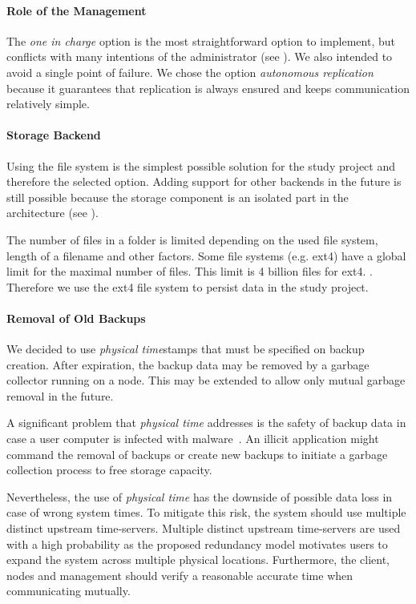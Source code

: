 \paragraph{Role of the Management}
The \emph{one in charge} option is the most straightforward option to implement, but conflicts with many intentions of the administrator (see ). We also intended to avoid a single point of failure. We chose the option \emph{autonomous replication} because it guarantees that replication is always ensured and keeps communication relatively simple.

\paragraph{Storage Backend}
Using the file system is the simplest possible solution for the study project and therefore the selected option. Adding support for other backends in the future is still possible because the storage component is an isolated part in the architecture (see ).

The number of files in a folder is limited depending on the used file system, length of a filename and other factors. Some file systems (e.g. ext4) have a global limit for the maximal number of files. This limit is 4 billion files for ext4. \cite{ext4}. Therefore we use the ext4 file system to persist data in the study project.

\paragraph{Removal of Old Backups}\label{sec:removal-of-old-backups}
We decided to use \emph{physical time}stamps that must be specified on backup creation. After expiration, the backup data may be removed by a garbage collector running on a \gls{node}. This may be extended to allow only mutual garbage removal in the future.

A significant problem that \emph{physical time} addresses is the safety of backup data in case a user computer is infected with malware~\cite{young-cryptovirology}. An illicit application might command the removal of backups or create new backups to initiate a garbage collection process to free storage capacity.

Nevertheless, the use of \emph{physical time} has the downside of possible data loss in case of wrong system times. To mitigate this risk, the system should use multiple distinct upstream time-servers. Multiple distinct upstream time-servers are used with a high probability as the proposed redundancy model motivates users to expand the system across multiple physical locations. Furthermore, the \gls{client}, \glspl{node} and \gls{management} should verify a reasonable accurate time when communicating mutually.

